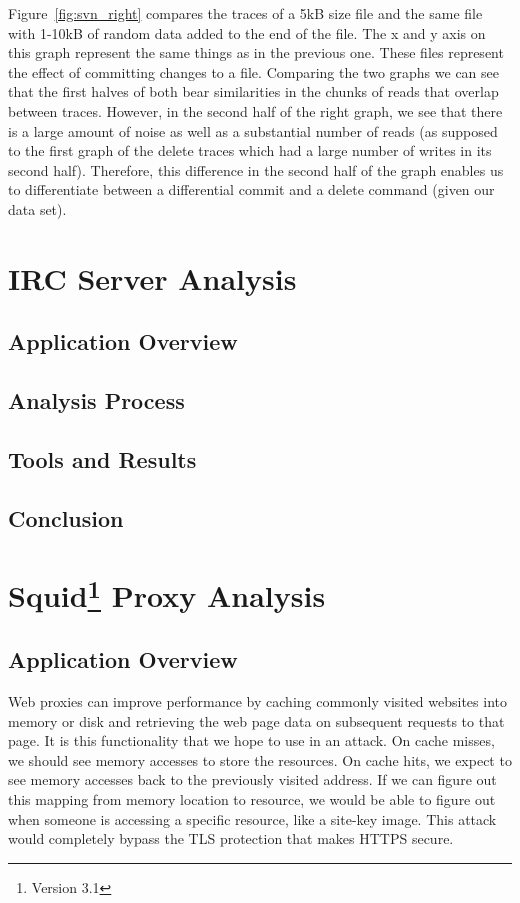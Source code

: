 \documentclass[11pt, oneside]{article}
\newcommand{\fref}[1]{Figure~\ref{#1}}
\begin{document}
\fref{fig:svn_right} compares the traces of a 5kB size file and the same file 
with 1-10kB of random data added to the end of the file. The x and y axis on 
this graph represent the same things as in the previous one. These files 
represent the effect of committing changes to a file. Comparing the two graphs 
we can see that the first halves of both bear similarities in the chunks of 
reads that overlap between traces. However, in the second half of the right 
graph, we see that there is a large amount of noise as well as a substantial 
number of reads (as supposed to the first graph of the delete traces which had 
a large number of writes in its second half). Therefore, this difference in 
the second half of the graph enables us to differentiate between a 
differential commit and a delete command (given our data set).

\section{IRC Server Analysis}
\subsection{Application Overview}
\subsection{Analysis Process}
\subsection{Tools and Results}
\subsection{Conclusion}

\section[Squid Proxy Analysis]{Squid\footnote{Version 3.1} Proxy Analysis}
\subsection{Application Overview}
Web proxies can improve performance by caching commonly visited websites 
into memory or disk and retrieving the web page data on subsequent requests 
to that page. It is this functionality that we hope to use in an attack. On 
cache misses, we should see memory accesses to store the resources. On 
cache hits, we expect to see memory accesses back to the previously visited
address. If we can figure out this mapping from memory location to resource,
we would be able to figure out when someone is accessing a specific resource, 
like a site-key image. This attack would completely bypass the TLS protection
that makes HTTPS secure.
\end{document}
